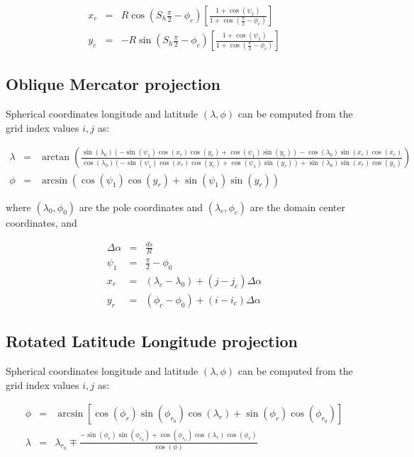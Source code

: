 \begin{eqnarray}
  x_c &=& R \cos \left(S_h \frac{\pi}{2} - \phi_c\right)
        \left[\frac{1+\cos(\psi_1)}{1+\cos\left(\frac{\pi}{2}-\phi_c\right)}
        \right] \\
  y_c &=& -R \sin \left(S_h \frac{\pi}{2} - \phi_c\right)
        \left[\frac{1+\cos(\psi_1)}{1+\cos\left(\frac{\pi}{2}-\phi_c\right)}
        \right]
\end{eqnarray}

\subsection{Oblique Mercator projection}

Spherical coordinates longitude and latitude $(\lambda, \phi)$ can be computed
from the grid index values $i,j$ as:

\begin{eqnarray}
  \lambda &=& \arctan\left(\frac{\sin(\lambda_0)\left(-\sin(\psi_1)
              \cos(x_r)\cos(y_r)+\cos(\psi_1)\sin(y_r)\right)
              -\cos(\lambda_0)\sin(x_r)\cos(x_r)}
              {\cos(\lambda_0)\left(-\sin(\psi_1)\cos(x_r)\cos(y_r)+
               \cos(\psi_1)\sin(y_r)\right)+\sin(\lambda_0)\sin(x_r)
               \cos(y_r)}\right) \\
  \phi &=& \arcsin\left( \cos(\psi_1)\cos(y_r)+\sin(\psi_1)\sin(y_r) \right)
\end{eqnarray}

where $(\lambda_0,\phi_0)$ are the pole coordinates and $(\lambda_c,\phi_c)$
are the domain center coordinates, and

\begin{eqnarray}
  \Delta\alpha &=& \frac{ds}{R} \\
  \psi_1 &=& \frac{\pi}{2} - \phi_0 \\
  x_r &=& (\lambda_c - \lambda_0) + (j-j_c) \Delta\alpha \\
  y_r &=& (\phi_c - \phi_0) + (i-i_c) \Delta\alpha
\end{eqnarray}

\subsection{Rotated Latitude Longitude projection}

Spherical coordinates longitude and latitude $(\lambda, \phi)$ can be computed
from the grid index values $i,j$ as:

\begin{eqnarray}
  \phi &=& \arcsin\left[ \cos(\phi_r) \sin(\phi_{r_0}) \cos(\lambda_r) +
           \sin(\phi_r) \cos(\phi_{r_0}) \right] \\
  \lambda &=& \lambda_{r_0} \mp \frac{-\sin(\phi_r) \sin(\phi_{r_0}) +
              \cos(\phi_{r_0}) \cos(\lambda_r) \cos(\phi_r)}{\cos(\phi)}
\end{eqnarray}

